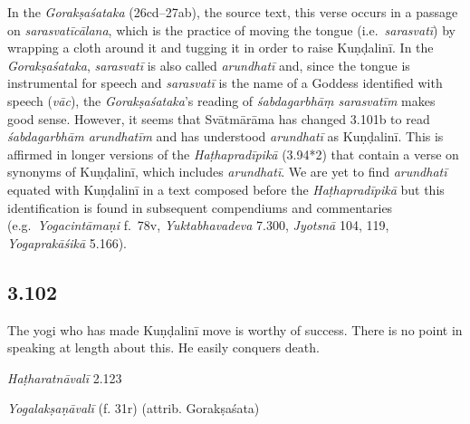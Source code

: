 \begin{ekdosis}
\begin{philcomm}[hp03_101]
In the \emph{Gorakṣaśataka} (26cd–27ab), the source text, this verse occurs in a passage on \emph{sarasvatīcālana}, which is the practice of moving the tongue (i.e.~\emph{sarasvatī}) by wrapping a cloth around it and tugging it in order to raise Kuṇḍalinī. In the \emph{Gorakṣaśataka}, \emph{sarasvatī} is also called \emph{arundhatī} and, since the tongue is instrumental for speech and \emph{sarasvatī} is the name of a Goddess identified with speech (\emph{vāc}), the \emph{Gorakṣaśataka}'s reading of \emph{śabdagarbhāṃ sarasvatīm} makes good sense. However, it seems that Svātmārāma has changed 3.101b to read \emph{śabdagarbhām arundhatīm} and has understood \emph{arundhatī} as Kuṇḍalinī. This is affirmed in longer versions of the \emph{Haṭhapradīpikā} (3.94*2) that contain a verse on synonyms of Kuṇḍalinī, which includes \emph{arundhatī}. We are yet to find \emph{arundhatī} equated with Kuṇḍalinī in a text composed before the \emph{Haṭhapradīpikā} but this identification is found in subsequent compendiums and commentaries (e.g.~\emph{Yogacintāmaṇi} f.~78v, \emph{Yuktabhavadeva} 7.300, \emph{Jyotsnā} 104, 119, \emph{Yogaprakāśikā} 5.166).
\end{philcomm}


\subsection*{3.102}
\begin{translation}[hp03_102]
The yogi who has made Kuṇḍalinī move is worthy of success. There is no point in speaking at length about this. He easily conquers death.
\end{translation}


\begin{testimonia}[hp03_102]
\emph{Haṭharatnāvalī} 2.123
\begin{versinnote}
\end{versinnote}

\emph{Yogalakṣaṇāvalī} (f. 31r)  (attrib. Gorakṣaśata)
\begin{versinnote}
\end{versinnote}


\end{testimonia}
\end{ekdosis}
